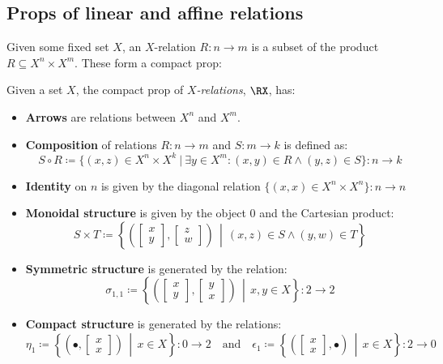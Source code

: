 \subsection{Props of linear and affine relations}
\label{subsec:linrelaffrel}
Given some fixed set \(X\), an \(X\)-relation \(R:n\to m\) is a subset of the product \(R\subseteq X^n \times X^m\).  These form a compact prop:
\begin{definition}
  \label{def:xrel}
  Given a set \(X\), the compact prop of {\em\(X\)-relations}, \(\RX\), has:
  \begin{itemize}
    \item \textbf{Arrows} are relations between \(X^n\) and \(X^m\).
    \item \textbf{Composition} of relations \(R:n\to m\) and \(S:m\to k\) is defined as:
    \[ S\circ R \coloneqq  \{ (x,z) \in X^{n}\times X^k \ | \ \exists y \in X^m: (x,y) \in R \wedge (y,z) \in S  \}:n\to k \]
    \item \textbf{Identity} on \(n\) is given by the diagonal relation \(\{(x,x) \in  X^n\times X^n \}:n\to n \)
    \item \textbf{Monoidal structure} is given by the object \(0\) and the Cartesian product:
      \[ S\times T \coloneqq \left\{\left(\begin{bmatrix}x\\y \end{bmatrix},\begin{bmatrix}z\\w\end{bmatrix}\right)  \,\middle|\,   (x,z) \in S\wedge  (y,w)\in T \right\} \]
    \item \textbf{Symmetric structure} is generated by the relation: 
      \[\sigma_{1,1}\coloneqq \left\{\left(\begin{bmatrix}x\\y \end{bmatrix},\begin{bmatrix}y\\x\end{bmatrix}\right)  \,\middle|\,  x,y\in X\right\}:2\to 2 \]
    \item \textbf{Compact structure} is generated by the relations: \[\eta_1\coloneqq \left\{\left(\bullet,\begin{bmatrix}x\\x\end{bmatrix}\right)  \,\middle|\,  x\in X\right\}:0\to 2\quad\text{and}\quad\epsilon_1\coloneqq \left\{\left(\begin{bmatrix}x\\x\end{bmatrix}, \bullet\right)  \,\middle|\,  x\in X\right\}:2\to 0\]
  \end{itemize}
\end{definition}
